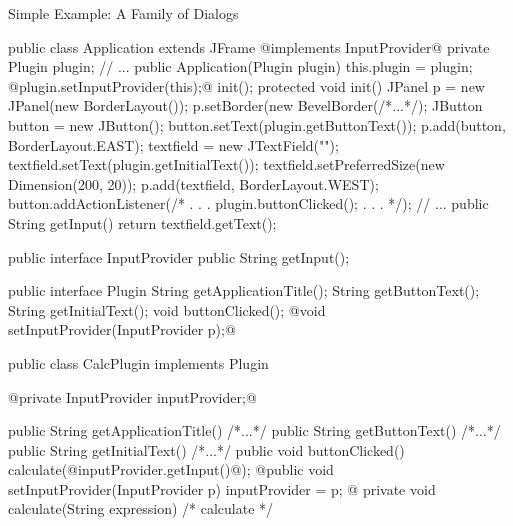 \begin{frame}[fragile]{Simple Example: A Family of Dialogs}
	\begin{mycolumns}[columns=2,widths={50,50}]
\tiny
\begin{codetight}{}
public class Application extends JFrame @implements InputProvider@ {
	private Plugin plugin;
	// ...
	public Application(Plugin plugin) {
		this.plugin = plugin;
		@plugin.setInputProvider(this);@
		init();
	}
	protected void init() {
		JPanel p = new JPanel(new BorderLayout());
		p.setBorder(new BevelBorder(/*...*/);
		JButton button = new JButton();
		button.setText(plugin.getButtonText());
		p.add(button, BorderLayout.EAST);
		textfield = new JTextField("");
		textfield.setText(plugin.getInitialText());
		textfield.setPreferredSize(new Dimension(200, 20));
		p.add(textfield, BorderLayout.WEST);		
		button.addActionListener(/* . . . plugin.buttonClicked(); . . . */);		
		// ...
	}
	public String getInput() {
		return textfield.getText();
	}
}
\end{codetight}
		\mynextcolumn
{\tiny
\begin{codetight}{}
public interface InputProvider {
	public String getInput();
}
\end{codetight}
\begin{codetight}{}
public interface Plugin {
	String getApplicationTitle();
	String getButtonText();
	String getInitialText();
	void buttonClicked();
	@void setInputProvider(InputProvider p);@
}
\end{codetight}
\begin{codetight}{}
public class CalcPlugin implements Plugin {
	@private InputProvider inputProvider;@

	public String getApplicationTitle() { /*...*/ }
	public String getButtonText() { /*...*/ }
	public String getInitialText() { /*...*/ }
	public void buttonClicked() {
		calculate(@inputProvider.getInput()@);
	}
	@public void setInputProvider(InputProvider p) {
		inputProvider = p;
	}@
	private void calculate(String expression) {
		/* calculate */
	}
}
\end{codetight}
}
	\end{mycolumns}
\end{frame}

